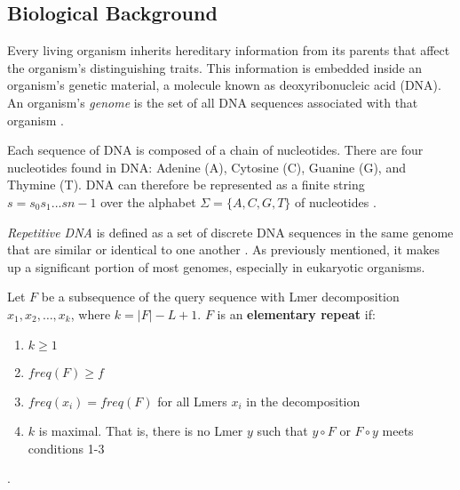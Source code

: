 \subsection{Biological Background}
Every living organism inherits hereditary information from its parents that affect the organism's distinguishing traits. This information is embedded inside an organism's genetic material, a molecule known as deoxyribonucleic acid (DNA). An organism's \textit{genome} is the set of all DNA sequences associated with that organism \cite{lewin2014lewins}.

Each sequence of DNA is composed of a chain of nucleotides. There are four nucleotides found in DNA: Adenine (A), Cytosine (C), Guanine (G), and Thymine (T). DNA can therefore be represented as a finite string $s=s_{0}s_{1}...s{n-1}$ over the alphabet $\Sigma=\lbrace A, C, G, T\rbrace$ of nucleotides \cite{elloumi2011algorithms}.

\textit{Repetitive DNA} is defined as a set of discrete DNA sequences in the same genome that are similar or identical to one another \cite{treangen2012repetitive}. As previously mentioned, it makes up a significant portion of most genomes, especially in eukaryotic organisms. 

\begin{defn}
Let $F$ be a subsequence of the query sequence with Lmer decomposition $x_{1},x_{2},\dotsc ,x_{k}$, where $k=\lvert F \rvert - L + 1$. $F$ is an \textbf{elementary repeat} if:
\begin{enumerate}
\item $k \geq 1$
\item $freq(F) \geq f$
\item $freq(x_{i})=freq(F)$ for all Lmers $x_{i}$ in the decomposition
\item $k$ is maximal. That is, there is no Lmer $y$ such that $y\circ F$ or $F\circ y$ meets conditions 1-3
\end{enumerate} \cite{figueroa2013raider}.
\end{defn}



